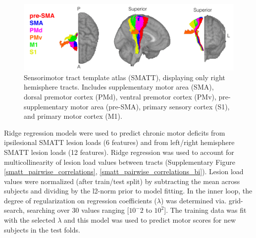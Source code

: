 \documentclass[10pt]{article}
\begin{document}
\begin{figure}[ht]
    \centering
    \includegraphics[width=0.7\linewidth]{figures/SMATT.png}
    \caption{Sensorimotor tract template atlas (SMATT), displaying only right hemisphere tracts. Includes supplementary motor area (SMA), dorsal premotor cortex (PMd), ventral premotor cortex (PMv), pre-supplementary motor area (pre-SMA), primary sensory cortex (S1),  and primary motor cortex (M1).}
    \label{smatt}
\end{figure}


Ridge regression models were used to predict chronic motor deficits from ipsilesional SMATT lesion loads (6 features) and from left/right hemisphere SMATT lesion loads (12 features). Ridge regression was used to account for multicollinearity of lesion load values between tracts (Supplementary Figure \ref{smatt_pairwise_correlations}, \ref{smatt_pairwise_correlations_bi}). Lesion load values were normalized (after train/test split) by subtracting the mean across subjects and dividing by the l2-norm prior to model fitting. In the inner loop, the degree of regularization on regression coefficients ($\lambda$) was determined via. grid-search, searching over 30 values ranging [$10^-2$ to $10^2$]. The training data was fit with the selected $\lambda$ and this model was used to predict motor scores for new subjects in the test folds.
\end{document}
